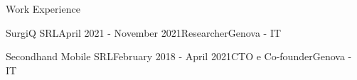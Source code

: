 \documentclass{resume} %
\begin{document}
%
%
%

\begin{rSection}{Work Experience}


\begin{rSubsection}{SurgiQ SRL}{April 2021 - November 2021}{Researcher}{Genova - IT}
\end{rSubsection}
\begin{rSubsection}{Secondhand Mobile SRL}{February 2018 - April 2021}{CTO e Co-founder}{Genova - IT}
\end{rSubsection}




\end{rSection}



\end{document}
